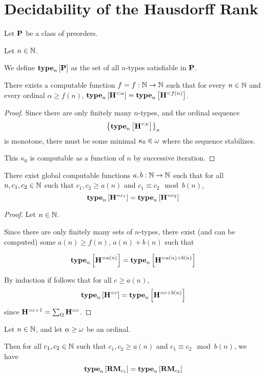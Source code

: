 \section{Decidability of the Hausdorff Rank}

\begin{definition}
    Let $\mathbf{P}$ be a class of preorders.

    Let $n \in \mathbb{N}$.

    We define $\mathbf{type}_{n} \left[ {\mathbf{P}} \right]$ as the set of all
    $n$-types satisfiable in $\mathbf{P}$.
\end{definition}

\begin{lemma}\label{f-lemma}
    There exists a computable function $f = f: \mathbb{N} \to \mathbb{N}$ such that
    for every $n \in \mathbb{N}$ and every ordinal $\alpha \ge f(n)$,
    $\mathbf{type}_{n} \left[ {\mathbf{H}^{< \alpha}} \right] = \mathbf{type}_{n} \left[ {\mathbf{H}^{< f(n)}} \right]$.
\end{lemma}

\begin{proof}
    Since there are only finitely many $n$-types,
    and the ordinal sequence \[\left\{ {\mathbf{type}_{n} \left[ {\mathbf{H}^{< \kappa}} \right]} \right\}_{\kappa}\]
    is monotone,
    there must be some minimal $\kappa_0 \in \omega$ where the sequence stabilizes.

    This $\kappa_0$ is computable as a function of $n$ by successive iteration.
\end{proof}

\begin{lemma}\label{ab-lemma}
    There exist global computable functions $a, b : \mathbb{N} \to \mathbb{N}$ such that
    for all $n, c_1, c_2 \in \mathbb{N}$ such that $c_1, c_2 \ge a(n)$ and $c_1 \equiv c_2 \mod b(n)$,
    \[\mathbf{type}_{n} \left[ {\mathbf{H}^{= c_1}} \right] = \mathbf{type}_{n} \left[ {\mathbf{H}^{= c_2}} \right]\]
\end{lemma}

\begin{proof}
    Let $n \in \mathbb{N}$.

    Since there are only finitely many sets of $n$-types,
    there exist (and can be computed)
    some $a(n) \ge f(n)$, $a(n) + b(n)$ such that

    \[
        \mathbf{type}_{n} \left[ {\mathbf{H}^{= a(n)}} \right] = \mathbf{type}_{n} \left[ {\mathbf{H}^{= a(n) + b(n)}} \right]
    \]

    By induction if follows that for all $c \ge a(n)$,
    \[
        \mathbf{type}_{n} \left[ {\mathbf{H}^{= c}} \right] = \mathbf{type}_{n} \left[ {\mathbf{H}^{= c + b(n)}} \right]
    \]
    since $\mathbf{H}^{= c + 1} = \sum_{\Omega} \mathbf{H}^{= c}$.
\end{proof}

\begin{corollary}\label{rmj-computable}
    Let $n \in \mathbb{N}$, and let $\alpha \ge \omega$ be an ordinal.

    Then for all $c_1, c_2 \in \mathbb{N}$ such that $c_1, c_2 \ge a(n)$ and $c_1 \equiv c_2 \mod b(n)$,
    we have
    \[\mathbf{type}_{n} \left[ {\mathbf{RM}_{c_1}} \right] = \mathbf{type}_{n} \left[ {\mathbf{RM}_{c_2}} \right]\]
\end{corollary}

